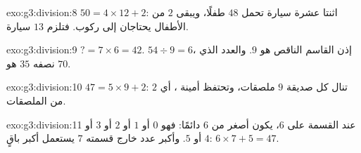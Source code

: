 \begin{solution}{exo:g3:division:8}
$50 = 4 \times 12 + 2$: اثنتا عشرة سيارة تحمل $48$ طفلًا، ويبقى $2$
من الأطفال يحتاجان إلى ركوب. فتلزم $13$ سيارة.
\end{solution}

\begin{solution}{exo:g3:division:9}
$? = 7 \times 6 = 42$. \quad
$54 \div 9 = 6$، إذن القاسم الناقص هو $9$. \quad
والعدد الذي نصفه $35$ هو $70$.
\end{solution}

\begin{solution}{exo:g3:division:10}
$47 = 5 \times 9 + 2$: تنال كل صديقة $9$ ملصقات، وتحتفظ أمينة
، أي $2$ من الملصقات.
\end{solution}

\begin{solution}{exo:g3:division:11}
عند القسمة على $6$، يكون  أصغر من $6$ دائمًا: فهو
$0$ أو $1$ أو $2$ أو $3$ أو $4$ أو $5$. وأكبر عدد خارج قسمته $7$
يستعمل أكبر باقٍ: $6 \times 7 + 5 = 47$.
\end{solution}

